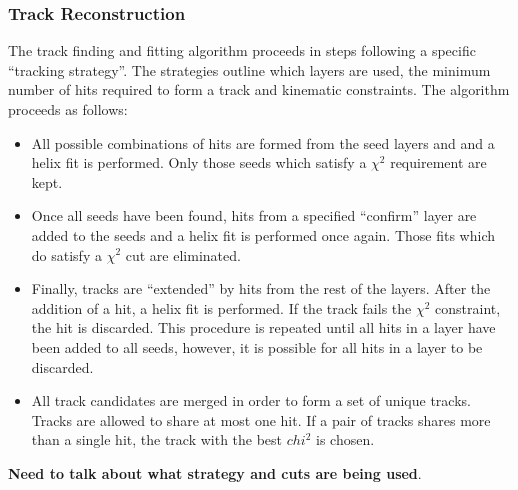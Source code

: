 \subsubsection{Track Reconstruction}

The track finding and fitting algorithm proceeds in steps following a specific 
``tracking strategy''.  The strategies outline which layers are used, the 
minimum number of hits required to form a track and kinematic constraints.  
The algorithm proceeds as follows:
\begin{itemize}
    \item All possible combinations of hits are formed from the seed layers and
          and a helix fit is performed.  Only those seeds which satisfy a 
          $\chi^2$ requirement are kept. 
    \item Once all seeds have been found, hits from a specified ``confirm'' 
          layer are added to the seeds and a helix fit is performed once again.
          Those fits which do satisfy a $\chi^2$ cut are eliminated.
    \item Finally, tracks are ``extended'' by hits from the rest of the layers.
          After the addition of a hit, a helix fit is performed.  If the track
          fails the $\chi^2$ constraint, the hit is discarded.  This procedure
          is repeated until all hits in a layer have been added to all seeds, 
          however, it is possible for all hits in a layer to be discarded.
    \item All track candidates are merged in order to form a set of unique 
          tracks.  Tracks are allowed to share at most one hit.  If a pair of
          tracks shares more than a single hit, the track with the best $chi^2$ 
          is chosen. 
\end{itemize}

\textbf{Need to talk about what strategy and cuts are being used}.

